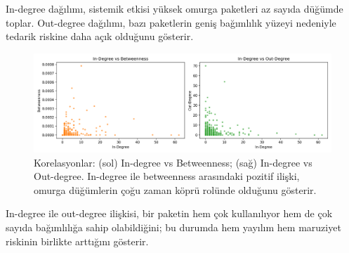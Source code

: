 \documentclass[11pt,a4paper]{article}
\begin{document}
\noindent In-degree dağılımı, sistemik etkisi yüksek omurga paketleri az sayıda düğümde toplar. Out-degree dağılımı, bazı paketlerin geniş bağımlılık yüzeyi nedeniyle tedarik riskine daha açık olduğunu gösterir.

\begin{figure}[H]
  \centering
  \includegraphics{scatter_correlations.png}
  \caption{Korelasyonlar: (sol) In-degree vs Betweenness; (sağ) In-degree vs Out-degree. In-degree ile betweenness arasındaki pozitif ilişki, omurga düğümlerin çoğu zaman köprü rolünde olduğunu gösterir.}
\end{figure}

\noindent In-degree ile out-degree ilişkisi, bir paketin hem çok kullanılıyor hem de çok sayıda bağımlılığa sahip olabildiğini; bu durumda hem yayılım hem maruziyet riskinin birlikte arttığını gösterir.
\end{document}
